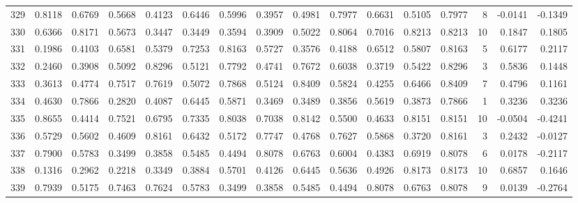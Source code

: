 \begin{tabular}{lrrrrrrrrrrrrrrr}
329 &      0.8118 &  0.6769 &  0.5668 &  0.4123 &  0.6446 &  0.5996 &  0.3957 &  0.4981 &  0.7977 &  0.6631 &   0.5105 &     0.7977 &      8 &                   -0.0141 &                    -0.1349 \\
330 &      0.6366 &  0.8171 &  0.5673 &  0.3447 &  0.3449 &  0.3594 &  0.3909 &  0.5022 &  0.8064 &  0.7016 &   0.8213 &     0.8213 &     10 &                    0.1847 &                     0.1805 \\
331 &      0.1986 &  0.4103 &  0.6581 &  0.5379 &  0.7253 &  0.8163 &  0.5727 &  0.3576 &  0.4188 &  0.6512 &   0.5807 &     0.8163 &      5 &                    0.6177 &                     0.2117 \\
332 &      0.2460 &  0.3908 &  0.5092 &  0.8296 &  0.5121 &  0.7792 &  0.4741 &  0.7672 &  0.6038 &  0.3719 &   0.5422 &     0.8296 &      3 &                    0.5836 &                     0.1448 \\
333 &      0.3613 &  0.4774 &  0.7517 &  0.7619 &  0.5072 &  0.7868 &  0.5124 &  0.8409 &  0.5824 &  0.4255 &   0.6466 &     0.8409 &      7 &                    0.4796 &                     0.1161 \\
334 &      0.4630 &  0.7866 &  0.2820 &  0.4087 &  0.6445 &  0.5871 &  0.3469 &  0.3489 &  0.3856 &  0.5619 &   0.3873 &     0.7866 &      1 &                    0.3236 &                     0.3236 \\
335 &      0.8655 &  0.4414 &  0.7521 &  0.6795 &  0.7335 &  0.8038 &  0.7038 &  0.8142 &  0.5500 &  0.4633 &   0.8151 &     0.8151 &     10 &                   -0.0504 &                    -0.4241 \\
336 &      0.5729 &  0.5602 &  0.4609 &  0.8161 &  0.6432 &  0.5172 &  0.7747 &  0.4768 &  0.7627 &  0.5868 &   0.3720 &     0.8161 &      3 &                    0.2432 &                    -0.0127 \\
337 &      0.7900 &  0.5783 &  0.3499 &  0.3858 &  0.5485 &  0.4494 &  0.8078 &  0.6763 &  0.6004 &  0.4383 &   0.6919 &     0.8078 &      6 &                    0.0178 &                    -0.2117 \\
338 &      0.1316 &  0.2962 &  0.2218 &  0.3349 &  0.3884 &  0.5701 &  0.4126 &  0.6445 &  0.5636 &  0.4926 &   0.8173 &     0.8173 &     10 &                    0.6857 &                     0.1646 \\
339 &      0.7939 &  0.5175 &  0.7463 &  0.7624 &  0.5783 &  0.3499 &  0.3858 &  0.5485 &  0.4494 &  0.8078 &   0.6763 &     0.8078 &      9 &                    0.0139 &                    -0.2764 \\

\end{tabular}
